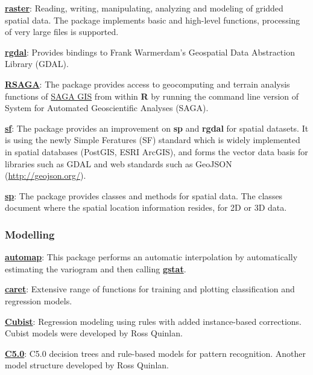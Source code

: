 \documentclass[
  10pt,
  b5paper,
  oneside]{book}
\theoremstyle{definition}
\theoremstyle{definition}
\theoremstyle{definition}
\theoremstyle{definition}
\theoremstyle{remark}
\begin{document}
\href{https://CRAN.R-project.org/package=raster}{\textbf{raster}}: Reading, writing, manipulating, analyzing and modeling of gridded spatial data. The package implements basic and high-level functions, processing of very large files is supported.

\href{https://CRAN.R-project.org/package=rgdal}{\textbf{rgdal}}: Provides bindings to Frank Warmerdam's Geospatial Data Abstraction Library (GDAL).

\href{https://CRAN.R-project.org/package=RSAGA}{\textbf{RSAGA}}: The package provides access to geocomputing and terrain analysis functions of \href{/url\%7Bhttp://www.saga-gis.org/en/index.html\%7D}{SAGA GIS} from within \textbf{R} by running the command line version of System for Automated Geoscientific Analyses (SAGA).

\href{https://cran.r-project.org/web/packages/sf/index.html}{\textbf{sf}}: The package provides an improvement on \textbf{sp} and \textbf{rgdal} for spatial datasets. It is using the newly Simple Feratures (SF) standard which is widely implemented in spatial databases (PostGIS, ESRI ArcGIS), and forms the vector data basis for libraries such as GDAL and web standards such as GeoJSON (\url{http://geojson.org/}).

\href{https://CRAN.R-project.org/package=sp}{\textbf{sp}}: The package provides classes and methods for spatial data. The classes document where the spatial location information resides, for 2D or 3D data.

\hypertarget{modelling}{%
\subsubsection{Modelling}\label{modelling}}

\href{https://CRAN.R-project.org/package=automap}{\textbf{automap}}: This package performs an automatic interpolation by automatically estimating the variogram and then calling \href{https://CRAN.R-project.org/package=gstat}{\textbf{gstat}}.

\href{https://CRAN.R-project.org/package=caret}{\textbf{caret}}: Extensive range of functions for training and plotting classification and regression models.

\href{https://CRAN.R-project.org/package=Cubist}{\textbf{Cubist}}: Regression modeling using rules with added instance-based corrections. Cubist models were developed by Ross Quinlan.

\href{https://CRAN.R-project.org/package=C5.0}{\textbf{C5.0}}: C5.0 decision trees and rule-based models for pattern recognition. Another model structure developed by Ross Quinlan.
\end{document}
